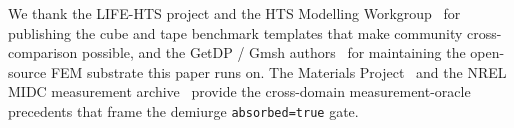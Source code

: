 \documentclass[11pt,a4paper]{article}
\newcommand{\absorbedtrue}{\textcolor{honestgreen}{\texttt{absorbed=true}}}
\begin{document}
We thank the LIFE-HTS project and the HTS Modelling
Workgroup~\cite{life_hts,pecher_sirois} for publishing the cube and
tape benchmark templates that make community cross-comparison
possible, and the GetDP / Gmsh authors~\cite{getdp,gmsh} for
maintaining the open-source FEM substrate this paper runs on. The
Materials Project~\cite{jain2013materialsproject} and the NREL
MIDC measurement archive~\cite{nrelmidc} provide the cross-domain
measurement-oracle precedents that frame the demiurge
\absorbedtrue{} gate.



\end{document}
